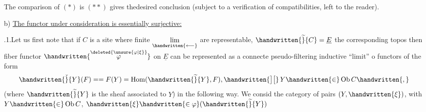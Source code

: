 \noindent The comparison of $(*)$ is $(**)$ gives the\handwritten{$\mid$}desired conclusion (subject to a verification of compatibilities, left to the reader).

\noindent{}%
b) \uline{The functor under consideration is essentially surjective:}

.1.\quad Let us first note that if $C$ is a site where finite $\mathop{\underset{\handwritten{\longleftarrow}}{\mathrm{lim}}}\limits$ are representable, $\handwritten{\widetilde}{C} = \underline{E}$ the corresponding topos then\handwritten{,} %
fiber functor $\handwritten{\overset{\deleted{\unsure{\varphi|\xi}}}{\varphi}}$ on $\underline E$ can be represented as a
\margin{\handwritten{$/\quad /\quad\varphi$}}
connecte pseudo-filtering inductive ``limit'' o functors of the form
\margin{\handwritten{$]\,[ $}}
\[
\handwritten{\check}{Y}(F) == F(Y) = \operatorname{Hom}(\handwritten{\widetilde}{Y},F),\handwritten{\big]\big[}\, Y\handwritten{\in}\operatorname{Ob} C\handwritten{,}
\]
(where $\handwritten{\widetilde}{Y}$ is the sheaf associated to $Y$)\handwritten{,} in the following way. We consid
\margin{\handwritten{,}}
the category of pairs $(Y,\handwritten{\xi})$, with $Y\handwritten{\in}\operatorname{Ob} C$, $\handwritten{\xi}\handwritten{\in\varphi}(\handwritten{\widetilde}{Y})$
\endgroup

\clearpage
